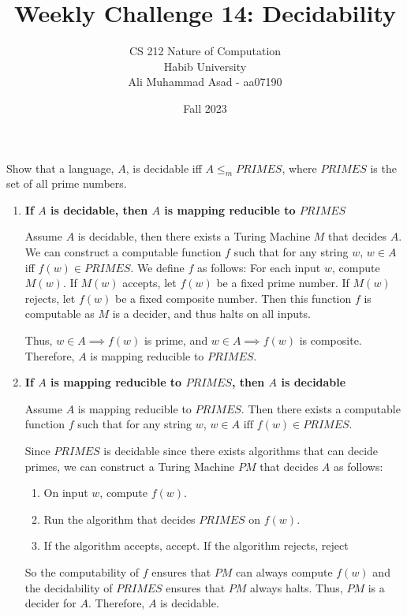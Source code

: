 \documentclass[a4paper]{exam}
\title{Weekly Challenge 14: Decidability}
\author{CS 212 Nature of Computation\\Habib University\\Ali Muhammad Asad - aa07190}
\date{Fall 2023}
\begin{document}
\maketitle

\begin{questions}


  Show that a language, $A$, is decidable iff $A \le_m PRIMES$, where $PRIMES$ is the set of all prime numbers.
  \begin{solution} \vspace*{-2mm}
    \begin{enumerate}
      \item \textbf{If $A$ is decidable, then $A$ is mapping reducible to $PRIMES$} 
      
      Assume $A$ is decidable, then there exists a Turing Machine $M$ that decides $A$. We can construct a computable function $f$ such that for any string $w$, $ w \in A $ iff $f(w) \in PRIMES$. We define $f$ as follows: For each input $w$, compute $ M(w) $. If $ M(w) $ accepts, let $ f(w) $ be a fixed prime number. If $ M(w) $ rejects, let $ f(w) $ be a fixed composite number. Then this function $f$ is computable as $M$ is a decider, and thus halts on all inputs.
      
      Thus, $ w \in A \implies f(w) $ is prime, and $ w \in A \implies f(w) $ is composite. Therefore, $A$ is mapping reducible to $PRIMES$.

      \item \textbf{If $A$ is mapping reducible to $PRIMES$, then $A$ is decidable}
      
      Assume $A$ is mapping reducible to $PRIMES$. Then there exists a computable function $f$ such that for any string $w$, $ w \in A \text{ iff } f(w) \in PRIMES $.

      Since $PRIMES$ is decidable since there exists algorithms that can decide primes, we can construct a Turing Machine $PM$ that decides $A$ as follows: \vspace*{-2mm}
      \begin{enumerate}[label=(\roman*)]
        \item On input $w$, compute $f(w)$. \vspace*{-1mm}
        \item Run the algorithm that decides $PRIMES$ on $f(w)$. \vspace*{-1mm}
        \item If the algorithm accepts, accept. If the algorithm rejects, reject
      \end{enumerate}
      So the computability of $f$ ensures that $PM$ can always compute $f(w)$ and the decidability of $PRIMES$ ensures that $PM$ always halts. Thus, $PM$ is a decider for $A$. Therefore, $A$ is decidable.
    \end{enumerate}


\end{solution}
\end{questions}
\end{document}
